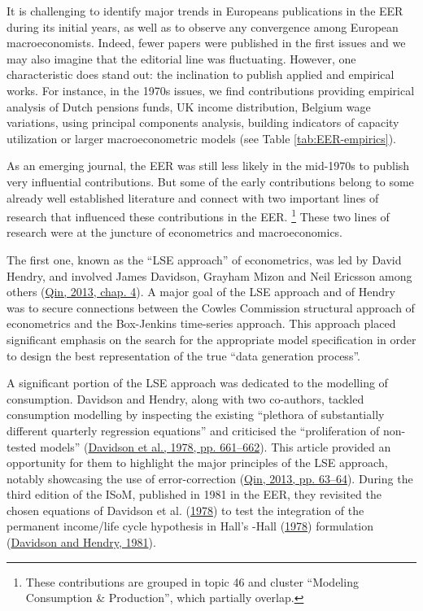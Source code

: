 \documentclass[
  12pt,
  onecolumn]{article}
\begin{document}
It is challenging to identify major trends in Europeans publications in the EER during its initial years, as well as to observe any convergence among European macroeconomists. Indeed, fewer papers were published in the first issues and we may also imagine that the editorial line was fluctuating. However, one characteristic does stand out: the inclination to publish applied and empirical works. For instance, in the 1970s issues, we find contributions providing empirical analysis of Dutch pensions funds, UK income distribution, Belgium wage variations, using principal components analysis, building indicators of capacity utilization or larger macroeconometric models (see Table \ref{tab:EER-empirics}).

As an emerging journal, the EER was still less likely in the mid-1970s to publish very influential contributions. But some of the early contributions belong to some already well established literature and connect with two important lines of research that influenced these contributions in the EER. \footnote{These contributions are grouped in topic 46 and cluster ``Modeling Consumption \& Production'', which partially overlap.} These two lines of research were at the juncture of econometrics and macroeconomics.

The first one, known as the ``LSE approach'' of econometrics, was led by David Hendry, and involved James Davidson, Grayham Mizon and Neil Ericsson among others (\protect\hyperlink{ref-qin2013a}{Qin, 2013, chap. 4}). A major goal of the LSE approach and of Hendry was to secure connections between the Cowles Commission structural approach of econometrics and the Box-Jenkins time-series approach. This approach placed significant emphasis on the search for the appropriate model specification in order to design the best representation of the true ``data generation process''.

A significant portion of the LSE approach was dedicated to the modelling of consumption. Davidson and Hendry, along with two co-authors, tackled consumption modelling by inspecting the existing ``plethora of substantially different quarterly regression equations'' and criticised the ``proliferation of non-tested models'' (\protect\hyperlink{ref-davidson1978}{Davidson et al., 1978, pp. 661--662}). This article provided an opportunity for them to highlight the major principles of the LSE approach, notably showcasing the use of error-correction (\protect\hyperlink{ref-qin2013a}{Qin, 2013, pp. 63--64}). During the third edition of the ISoM, published in 1981 in the EER, they revisited the chosen equations of Davidson et al. (\protect\hyperlink{ref-davidson1978}{1978}) to test the integration of the permanent income/life cycle hypothesis in Hall's -Hall (\protect\hyperlink{ref-hall1978b}{1978}) formulation (\protect\hyperlink{ref-davidson1981}{Davidson and Hendry, 1981}).
\end{document}
